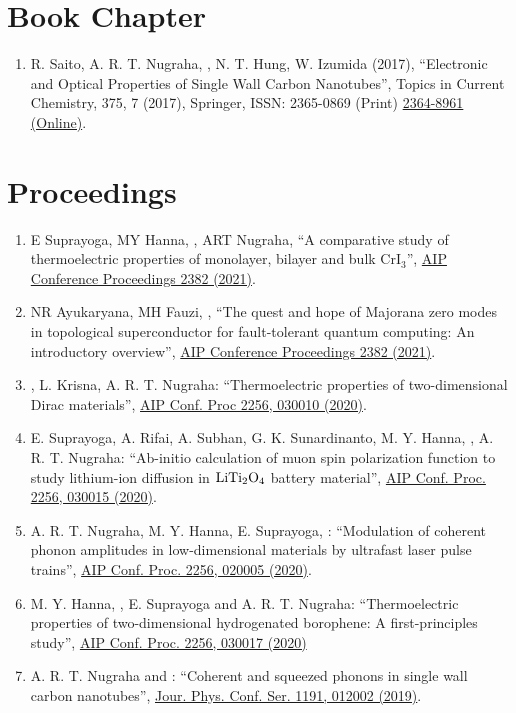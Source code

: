 \section*{Book Chapter}
\begin{enumerate}
\item R. Saito, A. R. T. Nugraha, \hes, N. T. Hung, W. Izumida (2017), ``Electronic and Optical Properties of Single Wall Carbon Nanotubes'', Topics in Current Chemistry, 375, 7 (2017), Springer, ISSN: 2365-0869 (Print) \href{http://dx.doi.org/10.1007/s41061-016-0095-2}{2364-8961 (Online)}.
\end{enumerate}

\vspace*{\baselineskip}

\section*{Proceedings}
\begin{enumerate}
 \item E Suprayoga, MY Hanna, \hes, ART Nugraha,
   ``A comparative study of thermoelectric properties of monolayer, bilayer and bulk CrI$_3$'', \href{https://doi.org/10.1063/5.0059994}{AIP Conference Proceedings 2382 (2021)}.
\item NR Ayukaryana, MH Fauzi, \hes, ``The quest and hope of Majorana zero modes in topological superconductor for fault-tolerant quantum computing: An introductory overview'', \href{https://doi.org/10.1063/5.0059974}{AIP Conference Proceedings 2382 (2021)}.
 \item \hes, L. Krisna, A. R. T. Nugraha:
  ``Thermoelectric properties of two-dimensional Dirac materials'',
   \href{https://doi.org/10.1063/5.0014592} {AIP Conf. Proc 2256, 030010 (2020)}.
\item E. Suprayoga, A. Rifai, A. Subhan, G. K. Sunardinanto, M. Y. Hanna, \hes,  A. R. T. Nugraha: ``Ab-initio calculation of muon spin polarization function to study lithium-ion diffusion in $\rm LiTi_2O_4$ battery material'', \href{https://doi.org/10.1063/5.0014693}{AIP Conf. Proc. 2256, 030015 (2020)}. 
\item A. R. T. Nugraha, M. Y. Hanna, E. Suprayoga, \hes: ``Modulation of coherent phonon amplitudes in low-dimensional materials by ultrafast laser pulse trains'', \href{https://doi.org/10.1063/5.0023505}{AIP Conf. Proc. 2256, 020005 (2020)}.
\item M. Y. Hanna, \hes, E. Suprayoga and A. R. T. Nugraha: ``Thermoelectric properties of two-dimensional hydrogenated borophene: A first-principles study'', \href{https://doi.org/10.1063/5.0014610}{AIP Conf. Proc. 2256, 030017 (2020)}
\item A. R. T. Nugraha and \hes: ``Coherent and squeezed phonons in single wall carbon nanotubes'', \href{https://doi.org/10.1088%2F1742-6596%2F1191%2F1%2F012002}
{Jour. Phys. Conf. Ser. 1191, 012002 (2019)}.
\end{enumerate}
\vspace*{\baselineskip}

